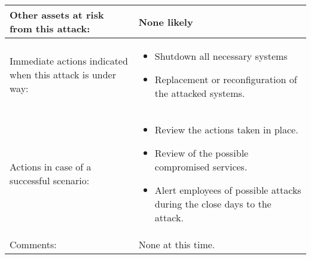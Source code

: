\begin{longtable}{| p{4cm} | p{8cm} |}
	Other assets at risk from this attack: &
	None likely\\\hline

	Immediate actions indicated when this attack is under way: &
	\begin{itemize}
	\item Shutdown all necessary systems
	\item Replacement or reconfiguration of the attacked systems.
	\end{itemize}\\\hline
	
	Actions in case of a successful scenario: &
	\begin{itemize}
	\item Review the actions taken in place.
	\item Review of the possible compromised services.
	\item Alert employees of possible attacks during the close days to the attack.
	\end{itemize}\\\hline
	
	Comments: & None at this time. \\\hline

\end{longtable}
